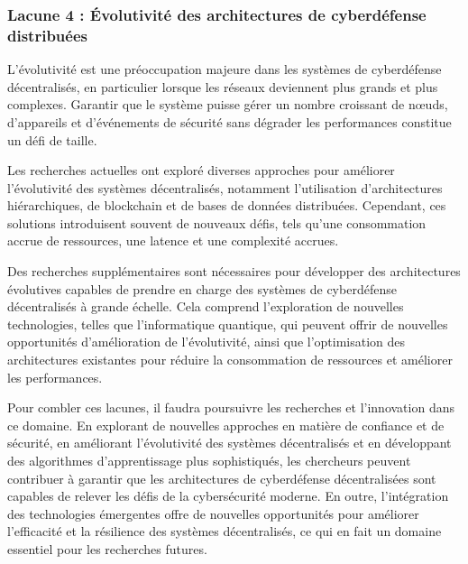 \subsubsection{Lacune 4 : Évolutivité des architectures de cyberdéfense distribuées}

L'évolutivité est une préoccupation majeure dans les systèmes de cyberdéfense décentralisés, en particulier lorsque les réseaux deviennent plus grands et plus complexes. Garantir que le système puisse gérer un nombre croissant de nœuds, d'appareils et d'événements de sécurité sans dégrader les performances constitue un défi de taille.

Les recherches actuelles ont exploré diverses approches pour améliorer l'évolutivité des systèmes décentralisés, notamment l'utilisation d'architectures hiérarchiques, de blockchain et de bases de données distribuées. Cependant, ces solutions introduisent souvent de nouveaux défis, tels qu'une consommation accrue de ressources, une latence et une complexité accrues.

Des recherches supplémentaires sont nécessaires pour développer des architectures évolutives capables de prendre en charge des systèmes de cyberdéfense décentralisés à grande échelle. Cela comprend l'exploration de nouvelles technologies, telles que l'informatique quantique, qui peuvent offrir de nouvelles opportunités d'amélioration de l'évolutivité, ainsi que l'optimisation des architectures existantes pour réduire la consommation de ressources et améliorer les performances.





Pour combler ces lacunes, il faudra poursuivre les recherches et l’innovation dans ce domaine. En explorant de nouvelles approches en matière de confiance et de sécurité, en améliorant l’évolutivité des systèmes décentralisés et en développant des algorithmes d’apprentissage plus sophistiqués, les chercheurs peuvent contribuer à garantir que les architectures de cyberdéfense décentralisées sont capables de relever les défis de la cybersécurité moderne. En outre, l’intégration des technologies émergentes offre de nouvelles opportunités pour améliorer l’efficacité et la résilience des systèmes décentralisés, ce qui en fait un domaine essentiel pour les recherches futures.



